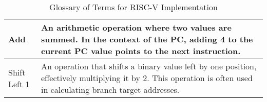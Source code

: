 \begin{table}[H]
\begin{tabularx}{\textwidth}{|p{3cm}|X|}
        \hline
        Add & An arithmetic operation where two values are summed. In the context of the PC, adding 4 to the current PC value points to the next instruction. \\
        \hline
        Shift Left 1 & An operation that shifts a binary value left by one position, effectively multiplying it by 2. This operation is often used in calculating branch target addresses. \\
        \hline
    \end{tabularx}
    \caption{Glossary of Terms for RISC-V Implementation}
    \label{tab:glossary}
\end{table}


